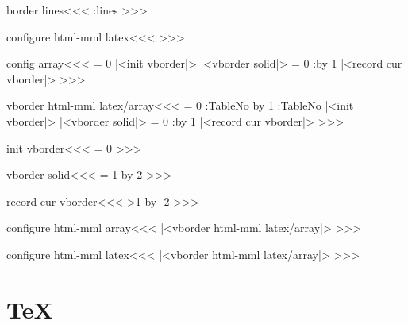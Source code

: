 {{{{{{\<border lines\><<<
\border:lines
>>>

\<configure html-mml latex\><<<
\def\border:lines{%
  \ifnum \borderlines>0 
     \ifnum \borderlines>1 border-right:solid 1px black;\fi
     \ifodd \borderlines border-left:solid 1px black;\fi
  \fi
}
>>>




\<config array\><<<
   {\HAssign\NewGroup = 0 
    |<init vborder|>}
   {|<vborder solid|>%
    \HAssign\NewGroup = 0}
   {\Advance:\NewGroup by 1 
    |<record cur vborder|>}
   {}
>>>



\<vborder html-mml latex/array\><<<
   {\let\VBorder=\empty \let\AllColMargins=\empty
    \global\let\GROUPS=\empty \HAssign\NewGroup = 0 
    \gHAdvance\Next:TableNo by 1 \global\let\TableNo=\Next:TableNo
    |<init vborder|>%
   }
   {|<vborder solid|>%
    \xdef\VBorder{\VBorder\ifnum \NewGroup> 0 </colgroup>\fi}
    \HAssign\NewGroup = 0  \gdef\GROUPS{rules="groups"}}
   {\Advance:\NewGroup by 1
    |<record cur vborder|>%
    \ifnum {} \xdef\VBorder{\VBorder<colgroup 
        id="TBL-\TableNo-\ar:cnt g">}\fi      
    \xdef\VBorder{\VBorder<col\Hnewline id="TBL-\TableNo
       -\ar:cnt"\xml:empty>}\xdef\AllColMargins{\AllColMargins1}}
   {\xdef\AllColMargins{\AllColMargins 0}}
>>>



\<init vborder\><<<
\HAssign\borderlines = 0
\global\let\columnlines=\relax
>>>

\<vborder solid\><<<
\ifx \columnlines\relax \gHAssign\borderlines = 1
                      \else \gHAdvance\borderlines by 2 \fi
>>>


\<record cur vborder\><<<
\ifnum \borderlines>1 \gHAdvance\borderlines by -2 \fi
\ifx \columnlines\relax 
    \global\let\columnlines\empty
\else
    \ifnum {} 
       \xdef\columnlines{\columnlines\ifx\columnlines\empty
                                     \else \space\fi solid}%
    \else
       \xdef\columnlines{\columnlines\ifx\columnlines\empty
                                     \else \space\fi none}%
    \fi
\fi
>>>

\<configure html-mml array\><<<
|<vborder html-mml latex/array|>
>>>

\<configure html-mml latex\><<<
|<vborder html-mml latex/array|>
>>>





\section{TeX}


}}}}}}
